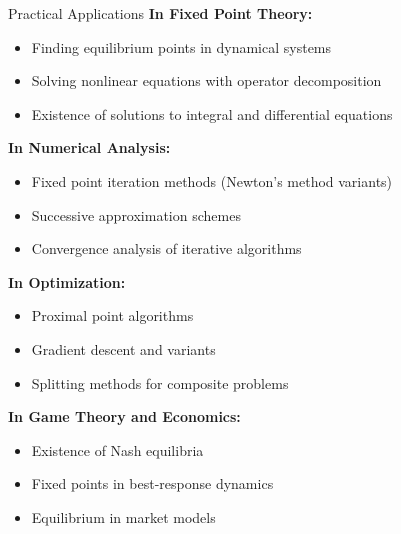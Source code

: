\documentclass[aspectratio=169,10pt]{beamer}
\begin{document}
\begin{frame}{Practical Applications}
    \textbf{In Fixed Point Theory:}
    \begin{itemize}
        \item Finding equilibrium points in dynamical systems
        \item Solving nonlinear equations with operator decomposition
        \item Existence of solutions to integral and differential equations
    \end{itemize}

    \vspace{0.3cm}
    \textbf{In Numerical Analysis:}
    \begin{itemize}
        \item Fixed point iteration methods (Newton's method variants)
        \item Successive approximation schemes
        \item Convergence analysis of iterative algorithms
    \end{itemize}

    \vspace{0.3cm}
    \textbf{In Optimization:}
    \begin{itemize}
        \item Proximal point algorithms
        \item Gradient descent and variants
        \item Splitting methods for composite problems
    \end{itemize}

    \vspace{0.3cm}
    \textbf{In Game Theory and Economics:}
    \begin{itemize}
        \item Existence of Nash equilibria
        \item Fixed points in best-response dynamics
        \item Equilibrium in market models
    \end{itemize}
\end{frame}
\end{document}
